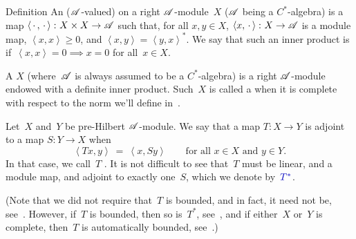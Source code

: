 \documentclass[a]{subfiles}
\begin{document}
\begin{parsec}%
\begin{point}{Definition}%
	An ($\mathscr{A}$-valued)
	on a right $\mathscr{A}$-module~$X$
($\mathscr{A}$ being a $C^*$-algebra) is a map
$\left<\,\cdot\,,\,\cdot\,\right>\colon X\times X\to\mathscr{A}$%
such that, for all $x,y\in X$,
$\left<x,\,\cdot\,\right>\colon X\to \mathscr{A}$
is a module map, $\left<x,x\right>\geq 0$,
and $\left<x,y\right>=\left<y,x\right>^*$.
We say that such an inner product is %
if~$\left<x,x\right>=0\implies x=0$ for all~$x\in X$.

A %
$X$ (where~$\mathscr{A}$ is always assumed to be a $C^*$-algebra)
is a right $\mathscr{A}$-module endowed with a definite inner product.
Such~$X$ is called
a %
when it is complete
with respect to
the norm we'll define in~.

Let~$X$ and~$Y$ be pre-Hilbert $\mathscr{A}$-module.
We say that a map $T\colon X\to Y$
is adjoint to a map $S\colon Y\to X$
when
\begin{equation*}
\left<Tx,y\right>\ =\ \left<x,Sy\right>
\qquad \text{for all $x\in X$ and $y\in Y$}.
\end{equation*}
In that case, we call~$T$ .%
It is not difficult to see that~$T$
must be linear, and a module map, and 
adjoint to exactly one~$S$, which we denote by~$\Define{T^*}$.%

(Note that we did not require that~$T$
is bounded, and in fact, it need not be, 
see~.
However, if~$T$ is bounded, then so is~$T^*$, 
see~,
and if either~$X$ or~$Y$ is complete,
then~$T$ is automatically bounded, see~.)


\end{point}
\end{parsec}
\end{document}
